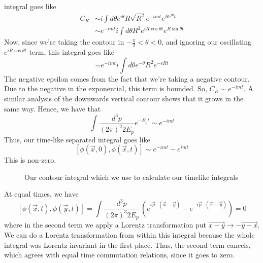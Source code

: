 \documentclass[11pt, oneside]{article}   	%
\theoremstyle{newline}
\theoremstyle{newline}
\theoremstyle{newline}
\theoremstyle{newline}
\theoremstyle{newline}
\begin{document}
integral goes like
\begin{align*}
C_R  & \sim i \int d \theta e^{ i \theta } R \sqrt{ R^ 2 } e^{  - i mt } e^{ R  e^{ i \theta } t } \\
& \sim  e^{  - i m t } i \int d \theta R^2 e ^{ i R \cos \theta t } e ^{ R \sin \theta t } 
\end{align*} Now, since we're taking the contour in 
$  -  \frac{\pi}{2 } <  \theta < 0$, and ignoring
our oscillating $ e ^{  i R \cos \theta t }$ term, 
this integral goes like 
\[
\sim e^{  - i m t } i  \int  d  \theta e^{ - \theta } R^2 e^{  - \epsilon R t }
\] The negative epsilon comes from the fact that 
we're taking a negative contour. Due to 
the negative in the exponential, this term is bounded. So, 
$ C_R \sim e^{  - i m t}$. A similar analysis of the 
downwards vertical contour shows that it grows in the same way. Hence, we have that 
\[
\int \frac{ d^ 3 p }{ ( 2 \pi )^2 2 E_{ p }} e^{  - E_{ p } t } \sim e^{ - i m t } 
\] Thus, our time-like separated integral goes like 
\[
[ \phi ( \vec{x}, 0), \phi ( \vec{x}, t ) ] \sim e^{  - i m t }  - e^{ i m t }
\] This is non-zero. 
\begin{figure}[h]
\centering 
{} 
\caption{Our contour integral which we use to calculate our timelike integrals}
\end{figure}

At equal times, we have 
\[
[ \phi ( \vec{x}, t ) , \phi ( \vec{y}, t ) ] = \int \frac{d^ 3 p }{ ( 2 \pi )^3 2E_p }\, ( e^{ i \vec{p} \cdot  ( \vec{x} - \vec{y}) }  - e^{  - i \vec{p} \cdot  ( \vec{x} - \vec{y}) } )  = 0  
\] where in the second term we apply a Lorentz transformation put $\vec{x - y } \to  - \vec{y - x}$. We can do a Lorentz transformation from within this integral because the whole 
integral was Lorentz invariant in the first place. 
Thus, the second term cancels, which agrees with equal time
commutation relations, since it goes to zero. 
\end{document}
